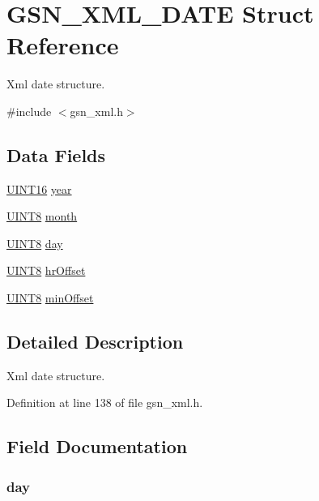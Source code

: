 \hypertarget{a00431}{
\section{GSN\_\-XML\_\-DATE Struct Reference}
\label{a00431}
}


Xml date structure.  




{\ttfamily \#include $<$gsn\_\-xml.h$>$}

\subsection*{Data Fields}
\begin{DoxyCompactItemize}
\item 
\hyperlink{a00660_ga09f1a1fb2293e33483cc8d44aefb1eb1}{UINT16} \hyperlink{a00431_a15cf81be0bc3b33c7cc971ed1a815c74}{year}
\item 
\hyperlink{a00660_gab27e9918b538ce9d8ca692479b375b6a}{UINT8} \hyperlink{a00431_a9a7060ed27a8fc1c0a801ca792fbc955}{month}
\item 
\hyperlink{a00660_gab27e9918b538ce9d8ca692479b375b6a}{UINT8} \hyperlink{a00431_a2121477f11d8a58cddd6a8c0e9717476}{day}
\item 
\hyperlink{a00660_gab27e9918b538ce9d8ca692479b375b6a}{UINT8} \hyperlink{a00431_aad11de9474bbeeed27b4986d738cf48e}{hrOffset}
\item 
\hyperlink{a00660_gab27e9918b538ce9d8ca692479b375b6a}{UINT8} \hyperlink{a00431_ab33c78dee679b2e12fbc4a8f3ae4c933}{minOffset}
\end{DoxyCompactItemize}


\subsection{Detailed Description}
Xml date structure. 

Definition at line 138 of file gsn\_\-xml.h.



\subsection{Field Documentation}
\hypertarget{a00431_a2121477f11d8a58cddd6a8c0e9717476}{
\subsubsection[{day}]{ {\bf day}}}
\label{a00431_a2121477f11d8a58cddd6a8c0e9717476}


